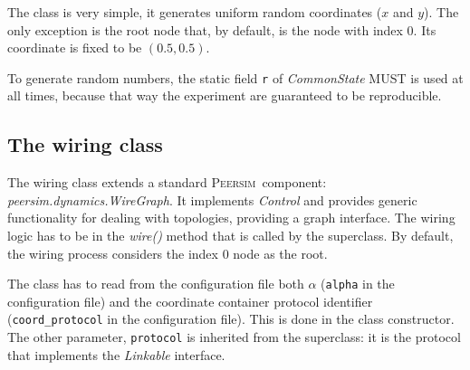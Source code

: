 \documentclass[a4paper,11pt]{article}
\newcommand{\id}[1]{{\scshape\small #1}}
\newcommand{\psim}{\id{Peersim}}
\begin{document}
The class is very simple, it
generates uniform random coordinates ($x$ and $y$).
The only exception is the root node that, by
default, is the node with index 0. Its coordinate is fixed to be $(0.5,
0.5)$.

To generate random numbers, the static field \texttt{r} of
\emph{CommonState} MUST is used at all times,
because that way the experiment are guaranteed to be reproducible.

\subsection{The wiring class}
\label{s:wiring}

The wiring class extends a standard \psim~component:
\emph{peersim.dynamics.WireGraph}. It implements \emph{Control}
and provides generic functionality for dealing with topologies,
providing a graph interface.
The wiring logic has to be in the
\emph{wire()} method that is called by the superclass.
By default, the wiring process considers the index 0 node as the root.

The class has to read from the configuration file both $\alpha$
(\texttt{alpha} in the configuration file) and the coordinate
container protocol identifier (\texttt{coord\_protocol} in the configuration
file). This
is done in the class constructor. The other parameter, \texttt{protocol}
is inherited from the superclass: it is the protocol that implements
the \emph{Linkable} interface.
\end{document}
